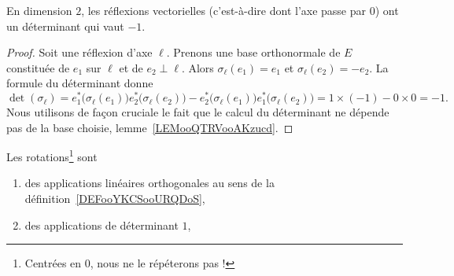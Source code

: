 \begin{lemma}       \label{LEMooSYZYooWDFScw}
	En dimension \( 2\), les réflexions vectorielles (c'est-à-dire dont l'axe passe par \( 0\)) ont un déterminant qui vaut \( -1\).
\end{lemma}

\begin{proof}
	Soit une réflexion d'axe \( \ell\). Prenons une base orthonormale de \( E\) constituée de \( e_1\) sur \( \ell\) et de \( e_2\perp \ell\). Alors \( \sigma_{\ell}(e_1)=e_1\) et \( \sigma_{\ell}(e_2)=-e_2\). La formule du déterminant donne
	\begin{equation}
		\det(\sigma_{\ell})=e_1^*\big( \sigma_{\ell}(e_1) \big)e_2^*\big( \sigma_{\ell}(e_2) \big)-e_2^*\big( \sigma_{\ell}(e_1) \big)e_1^*\big( \sigma_{\ell}(e_2) \big)=1\times (-1)-0\times 0=-1.
	\end{equation}
	Nous utilisons de façon cruciale le fait que le calcul du déterminant ne dépende pas de la base choisie, lemme~\ref{LEMooQTRVooAKzucd}.
\end{proof}

\begin{proposition}     \label{PROPooTUJWooAjtEnQ}
	Les rotations\footnote{Centrées en \( 0\), nous ne le répéterons pas !} sont
	\begin{enumerate}
		\item
		      des applications linéaires orthogonales au sens de la définition~\ref{DEFooYKCSooURQDoS},
		\item
		      des applications de déterminant \( 1\),
	\end{enumerate}
\end{proposition}


